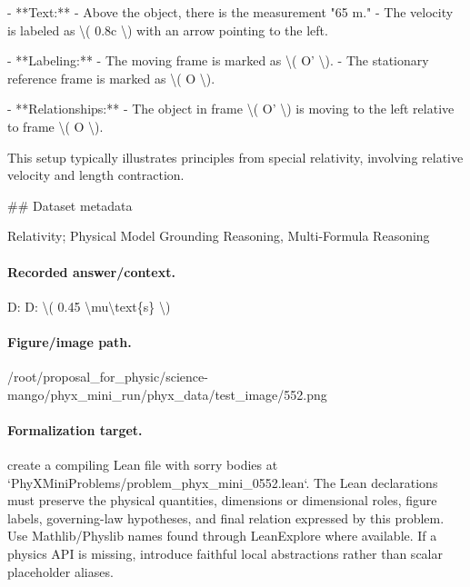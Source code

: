 - **Text:**
  - Above the object, there is the measurement "65 m."
  - The velocity is labeled as \textbackslash{}( 0.8c \textbackslash{}) with an arrow pointing to the left.
  
- **Labeling:**
  - The moving frame is marked as \textbackslash{}( O' \textbackslash{}).
  - The stationary reference frame is marked as \textbackslash{}( O \textbackslash{}).

- **Relationships:**
  - The object in frame \textbackslash{}( O' \textbackslash{}) is moving to the left relative to frame \textbackslash{}( O \textbackslash{}). 

This setup typically illustrates principles from special relativity, involving relative velocity and length contraction.

\#\# Dataset metadata

Relativity; Physical Model Grounding Reasoning, Multi-Formula Reasoning

\paragraph{Recorded answer/context.}
D: D: \textbackslash{}( 0.45 \textbackslash{}mu\textbackslash{}text\{s\} \textbackslash{})

\paragraph{Figure/image path.}
/root/proposal\_for\_physic/science-mango/phyx\_mini\_run/phyx\_data/test\_image/552.png

\paragraph{Formalization target.}
create a compiling Lean file with sorry bodies at `PhyXMiniProblems/problem\_phyx\_mini\_0552.lean`. The Lean declarations must preserve the physical quantities, dimensions or dimensional roles, figure labels, governing-law hypotheses, and final relation expressed by this problem.
Use Mathlib/Physlib names found through LeanExplore where available. If a physics API is missing, introduce faithful local abstractions rather than scalar placeholder aliases.

